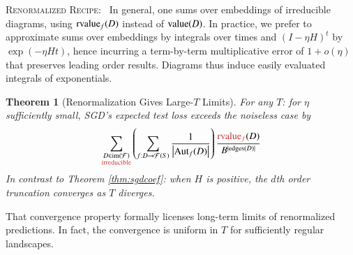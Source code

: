 \documentclass{article}
\theoremstyle{plain}
\newtheorem{thm}{Theorem}
\theoremstyle{definition}
\newcommand{\wrap}[1]{\left(#1\right)}
\newcommand{\wabs}[1]{\left|#1\right|}
\newcommand{\Free}{\mathcal{F}}
\newcommand{\Aut}{\text{\textnormal{Aut}}}
\newcommand{\image}{\text{\textnormal{im}}}
\newcommand{\dvalue}{\text{\textnormal{value}}}
\newcommand{\rvalue}{\text{\textnormal{rvalue}}}
\newcommand{\edges}{\text{\textnormal{edges}}}
\begin{document}
        \textsc{Renormalized Recipe:}~
            In general, one sums over embeddings of irreducible diagrams, using
            $\rvalue_f(D)$ instead of $\dvalue(D)$.  In practice, we prefer to
            approximate sums over embeddings by integrals over times and
            $(I-\eta H)^t$ by $\exp(- \eta H t)$, hence incurring a
            term-by-term multiplicative error of $1 + o(\eta)$ that preserves
            leading order results.  Diagrams thus induce easily evaluated
            integrals of exponentials.
       
        \begin{thm}[Renormalization Gives Large-$T$ Limits] \label{thm:renorm}
            For any $T$: for $\eta$ sufficiently small, SGD's expected test
            loss exceeds the noiseless case by 
            \begin{equation*} \label{eq:renorm}
                \sum_{\substack{
                    D \in \image(\Free)\\ \text{\color{moor} irreducible}
                }}
                \wrap{
                    \sum_{f: D\to\Free(S)}
                    \frac{1}{\wabs{\Aut_f(D)}}
                }
                \frac{{\color{moor} \rvalue_f}(D)}{B^{|\edges(D)|}}
            \end{equation*}
            In contrast to Theorem \ref{thm:sgdcoef}: when $H$ is positive, the
            $d$th order truncation converges as $T$ diverges.
        \end{thm}
        That convergence property formally licenses long-term limits of
        renormalized predictions.  In fact, the convergence is uniform in $T$
        for sufficiently regular landscapes.
\end{document}

